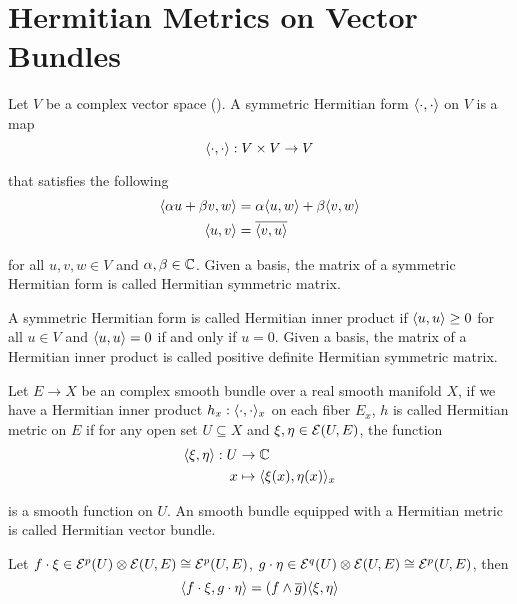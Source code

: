 \section{Hermitian Metrics on Vector Bundles}

\begin{definition}
	Let $V$ be a complex vector space (). A symmetric Hermitian form $\langle\cdot, \cdot\rangle$ on $V$ is a map
	$$
	\langle\cdot, \cdot\rangle: V \times V \to V
	$$
	
	that satisfies the following
	\begin{align*}
		\langle\alpha u + \beta v, w\rangle &= \alpha \langle u, w\rangle + \beta \langle v, w\rangle \\
		\langle u, v\rangle &= \overline{\langle v, u\rangle}
	\end{align*}
	
	for all $u, v, w \in V$ and $\alpha, \beta \in \mathbb{C}$. Given a basis, the matrix of a symmetric Hermitian form is called Hermitian symmetric matrix.
\end{definition}

\begin{definition}
	A symmetric Hermitian form is called Hermitian inner product if $\langle u, u\rangle \geq 0$ for all $u \in V$ and $\langle u, u\rangle = 0$ if and only if $u = 0$. Given a basis, the matrix of a Hermitian inner product is called positive definite Hermitian symmetric matrix.
\end{definition}

\begin{definition}
	Let $E \to X$ be an complex smooth bundle over a real smooth manifold $X$, if we have a Hermitian inner product $h_x: \langle\cdot, \cdot\rangle_x$ on each fiber $E_x$, $h$ is called Hermitian metric on $E$ if for any open set $U \subseteq X$ and $\xi, \eta \in \mathcal{E}(U, E)$, the function
	\begin{align*}
		\langle\xi, \eta\rangle:  U &\to \mathbb{C} \\
		x &\mapsto \langle\xi(x), \eta(x)\rangle_x
	\end{align*}
	
	is a smooth function on $U$. An smooth bundle equipped with a Hermitian metric is called Hermitian vector bundle.
	
	Let $f \cdot \xi \in \mathcal{E}^p(U) \otimes \mathcal{E}(U, E) \cong \mathcal{E}^p(U, E)$, $g \cdot \eta \in \mathcal{E}^q(U) \otimes \mathcal{E}(U, E) \cong \mathcal{E}^p(U, E)$, then
	$$
		\langle f \cdot \xi, g \cdot \eta\rangle = (f \wedge \overline{g}) \langle\xi, \eta\rangle
	$$
\end{definition}

